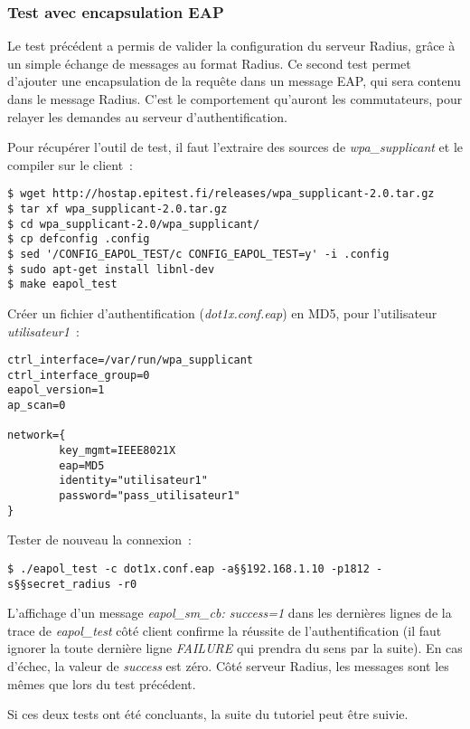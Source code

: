 \subsubsection{Test avec encapsulation EAP}

Le test précédent a permis de valider la configuration du serveur Radius, grâce à un simple échange de messages au format Radius. Ce second test permet d'ajouter une encapsulation de la requête dans un message EAP, qui sera contenu dans le message Radius. C'est le comportement qu'auront les commutateurs, pour relayer les demandes au serveur d'authentification.

\label{eapol-test}
Pour récupérer l'outil de test, il faut l'extraire des sources de \emph{wpa\_supplicant} et le compiler sur le client~:

\begin{lstlisting}
$ wget http://hostap.epitest.fi/releases/wpa_supplicant-2.0.tar.gz
$ tar xf wpa_supplicant-2.0.tar.gz
$ cd wpa_supplicant-2.0/wpa_supplicant/
$ cp defconfig .config
$ sed '/CONFIG_EAPOL_TEST/c CONFIG_EAPOL_TEST=y' -i .config
$ sudo apt-get install libnl-dev
$ make eapol_test
\end{lstlisting}

Créer un fichier d'authentification (\emph{dot1x.conf.eap}) en MD5, pour l'utilisateur \emph{utilisateur1}~:

\begin{lstlisting}
ctrl_interface=/var/run/wpa_supplicant
ctrl_interface_group=0
eapol_version=1
ap_scan=0

network={
        key_mgmt=IEEE8021X
        eap=MD5
        identity="utilisateur1"
        password="pass_utilisateur1"
}
\end{lstlisting}

Tester de nouveau la connexion~:

\begin{lstlisting}
$ ./eapol_test -c dot1x.conf.eap -a§§192.168.1.10 -p1812 -s§§secret_radius -r0
\end{lstlisting} 

L'affichage d'un message \og{}\emph{eapol\_sm\_cb: success=1}\fg{} dans les dernières lignes de la trace de \emph{eapol\_test} côté client confirme la réussite de l'authentification (il faut ignorer la toute dernière ligne \emph{FAILURE} qui prendra du sens par la suite). En cas d'échec, la valeur de \emph{success} est zéro. Côté serveur Radius, les messages sont les mêmes que lors du test précédent.

Si ces deux tests ont été concluants, la suite du tutoriel peut être suivie.
